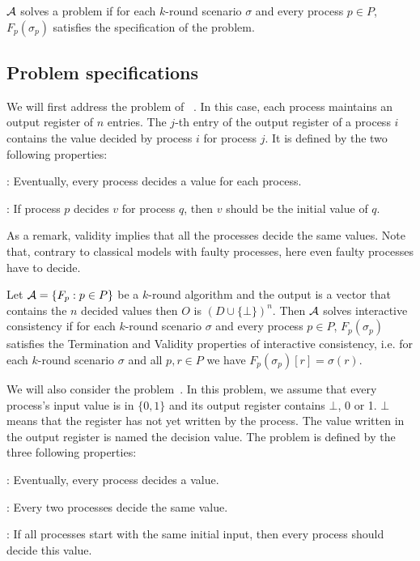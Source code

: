 {{ $\cal A$ solves a problem 
 if for each $k$-round scenario $\sigma$ and every process $p
\in P$,  $F_{p} ( \sigma_{p} )$ satisfies the specification of the
problem.




\subsection{Problem specifications}
We will first address the problem of {}~\cite{fischer1983consensus}. 
In this case, each process maintains an output register of $n$ entries. 
The $j$-th entry of the output register of a process $i$ contains the value decided by process $i$ for process $j$.
It is defined by the  two following properties:
\begin{itemizedot}
  \item {}: Eventually, every process decides a value for
  each process.
  
  \item {}: If process $p$ decides $v$ for process $q$, then
  $v$ should be the initial value of $q$.
\end{itemizedot}
As a remark, validity implies that all the processes decide the same
values.
Note that, contrary to classical models with faulty processes, here
even faulty processes have to decide. 

Let ${\cal A}= \{
F_{p} :p \in P \}$ be a $k$-round algorithm and the output is a vector that contains the  $n$ decided values then  $O$ is $(D\cup \{\bot\})^n$.
Then $\cal A$ solves  interactive
consistency if for each $k$-round scenario $\sigma$ and 
every process $p
\in P$,  $F_{p} ( \sigma_{p} )$ satisfies the Termination and Validity properties of interactive consistency, i.e.
for each $k$-round scenario $\sigma$ and all $p,r
\in P$ we have $F_{p} ( \sigma_{p} )[r] = \sigma ( r )$.


\vspace{1em}
We will also consider the {} problem~\cite{fischer1983consensus}. 
In this problem, we assume that every process's input value is in $\{0,1\}$
and its output register contains $\bot$, 0 or 1. $\bot$ means that the
register has not yet written by the process. 
The value written in the output register is named the decision value.
The  {} problem is defined by the three
following properties: 
\begin{itemizedot}
  \item {}: Eventually, every process decides a value.
  \item {}: Every two processes decide the same value.
  \item {}: If  all processes start with the same
    initial input, then every process should decide this value. 
\end{itemizedot}


}}
